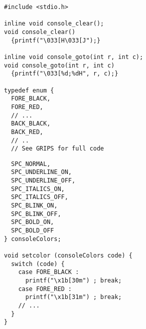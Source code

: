 
\begin{frame}[fragile]
%
%
\begin{codebox}[Beispiel: Wrapper für Konsole, equal height group=grWrapperColour]
\begin{verbatim}
#include <stdio.h>

inline void console_clear();
void console_clear() 
  {printf("\033[H\033[J");}

inline void console_goto(int r, int c);
void console_goto(int r, int c)
  {printf("\033[%d;%dH", r, c);}

typedef enum {
  FORE_BLACK,
  FORE_RED,
  // ...
  BACK_BLACK,
  BACK_RED,
  // ..
  // See GRIPS for full code
\end{verbatim}
\end{codebox}
%	
\begin{codebox}[Beispiel: ... Fortsetzung ..., equal height group=grWrapperColour]
\begin{verbatim}
  SPC_NORMAL,
  SPC_UNDERLINE_ON,
  SPC_UNDERLINE_OFF,
  SPC_ITALICS_ON,
  SPC_ITALICS_OFF,
  SPC_BLINK_ON,
  SPC_BLINK_OFF,
  SPC_BOLD_ON,
  SPC_BOLD_OFF
} consoleColors;

void setcolor (consoleColors code) {
  switch (code) {
    case FORE_BLACK :
      printf("\x1b[30m") ; break;
    case FORE_RED :
      printf("\x1b[31m") ; break;
    // ...
  }
}
\end{verbatim}
\end{codebox}
%
\end{frame}


